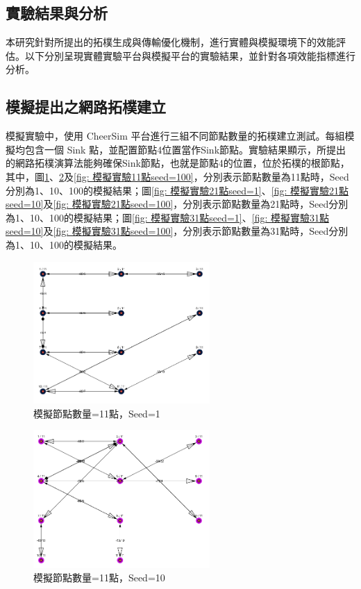 \begin{ZhChapter}
\section{實驗結果與分析}
本研究針對所提出的拓樸生成與傳輸優化機制，進行實體與模擬環境下的效能評估。以下分別呈現實體實驗平台與模擬平台的實驗結果，並針對各項效能指標進行分析。

\subsection{模擬提出之網路拓樸建立}
模擬實驗中，使用 CheerSim 平台進行三組不同節點數量的拓樸建立測試。每組模擬均包含一個 Sink 點，並配置節點4位置當作Sink節點。實驗結果顯示，所提出的網路拓樸演算法能夠確保Sink節點，也就是節點4的位置，位於拓樸的根節點，其中，圖\ref{fig: 模擬實驗11點seed=1}、\ref{fig: 模擬實驗11點seed=10}及\ref{fig: 模擬實驗11點seed=100}，分別表示節點數量為11點時，Seed分別為1、10、100的模擬結果；圖\ref{fig: 模擬實驗21點seed=1}、\ref{fig: 模擬實驗21點seed=10}及\ref{fig: 模擬實驗21點seed=100}，分別表示節點數量為21點時，Seed分別為1、10、100的模擬結果；圖\ref{fig: 模擬實驗31點seed=1}、\ref{fig: 模擬實驗31點seed=10}及\ref{fig: 模擬實驗31點seed=100}，分別表示節點數量為31點時，Seed分別為1、10、100的模擬結果。

\begin{figure}[H]
    \centering
    \includegraphics[width = 0.6\textwidth]{image/模擬實驗11點seed=1.png}
    \caption{模擬節點數量=11點，Seed=1}
    \label{fig: 模擬實驗11點seed=1}
\end{figure}

\begin{figure}[H]
    \centering
    \includegraphics[width = 0.6\textwidth]{image/模擬實驗11點seed=10.png}
    \caption{模擬節點數量=11點，Seed=10}
    \label{fig: 模擬實驗11點seed=10}
\end{figure}


\end{ZhChapter}
